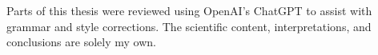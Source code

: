Parts of this thesis were reviewed using OpenAI's ChatGPT to assist with grammar and style corrections.
The scientific content, interpretations, and conclusions are solely my own.

